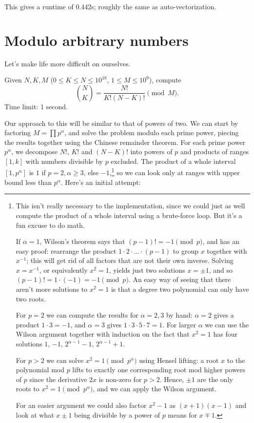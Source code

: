 This gives a runtime of 0.442s; roughly the same as auto-vectorization.

\section{Modulo arbitrary numbers}

Let's make life more difficult on ourselves.

\begin{framed}
\noindent
Given $N, K, M$ ($0 \le K \le N \le 10^{18}$, $1 \le M \le 10^9$), compute
\[
\binom N K = \frac{N!}{K!(N-K)!} \pmod {M}.
\]
Time limit: 1 second.
\end{framed}

Our approach to this will be similar to that of powers of two.
We can start by factoring $M = \prod p^\alpha$, and solve the problem modulo each prime power, piecing the results together using the Chinese remainder theorem.
For each prime power $p^\alpha$, we decompose $N!$, $K!$ and $(N-K)!$ into powers of $p$ and products of ranges $[1, k]$ with numbers divisible by $p$ excluded.
The product of a whole interval $[1, p^\alpha]$ is $1$ if $p = 2, \alpha \ge 3$, else $-1$,\footnote{
This isn't really necessary to the implementation, since we could just as well compute the product of a whole interval using a brute-force loop. But it's a fun excuse to do math.

If $\alpha = 1$, Wilson's theorem says that $(p-1)! = -1 \pmod{p}$, and has an easy proof: rearrange the product $1 \cdot 2 \cdot \ldots \cdot (p-1)$ to group $x$ together with $x^{-1}$; this will get rid of all factors that are not their own inverse. Solving $x = x^{-1}$, or equivalently $x^2 = 1$, yields just two solutions $x = \pm 1$, and so $(p-1)! = 1 \cdot (-1) = -1\pmod{p}$. An easy way of seeing that there aren't more solutions to $x^2 = 1$ is that a degree two polynomial can only have two roots.

For $p = 2$ we can compute the results for $\alpha = 2, 3$ by hand: $\alpha = 2$ gives a product $1 \cdot 3 = -1$, and $\alpha = 3$ gives $1 \cdot 3 \cdot 5 \cdot 7 = 1$. For larger $\alpha$ we can use the Wilson argument together with induction on the fact that $x^2 = 1$ has four solutions $1$, $-1$, $2^{\alpha-1} - 1$, $2^{\alpha-1} + 1$.

For $p > 2$ we can solve $x^2 = 1 \pmod{p^\alpha}$ using Hensel lifting: a root $x$ to the polynomial mod $p$ lifts to exactly one corresponding root mod higher powers of $p$ since the derivative $2x$ is non-zero for $p > 2$. Hence, $\pm 1$ are the only roots to $x^2 = 1 \pmod{p^\alpha}$, and we can apply the Wilson argument.

For an easier argument we could also factor $x^2-1$ as $(x+1)(x-1)$ and look at what $x\pm 1$ being divisible by a power of $p$ means for $x\mp 1$.
}
so we can look only at ranges with upper bound less than $p^\alpha$.
Here's an initial attempt:


